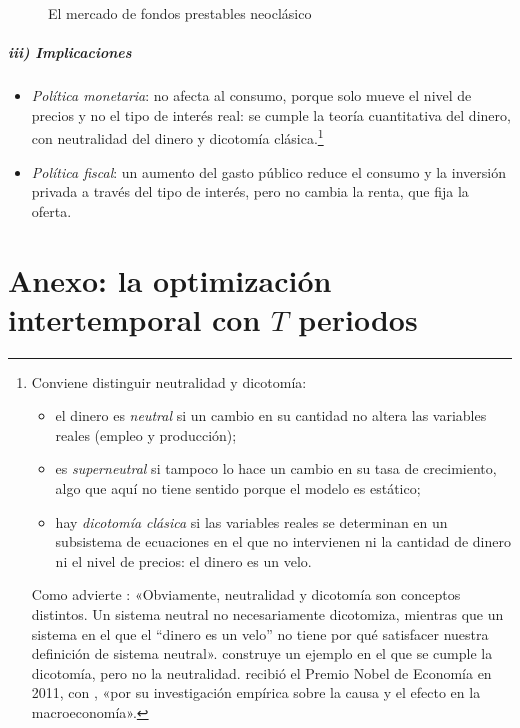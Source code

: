 \documentclass[11pt]{article}
\begin{document}
\begin{figure}[H]
\centering
\caption{El mercado de fondos prestables neoclásico}\label{fig:fondos-prestables}
\end{figure}

\subparagraph{iii) Implicaciones}

\begin{itemize}
\item \emph{Política monetaria}: no afecta al consumo, porque solo mueve el nivel de precios y no el tipo de interés real: se cumple la teoría cuantitativa del dinero, con neutralidad del dinero y dicotomía clásica.\footnote{Conviene distinguir neutralidad y dicotomía\nocite{Serletis2007Demand}:
\begin{itemize}
\item el dinero es \emph{neutral} si un cambio en su cantidad no altera las variables reales (empleo y producción);
\item es \emph{superneutral} si tampoco lo hace un cambio en su tasa de crecimiento, algo que aquí no tiene sentido porque el modelo es estático;
\item hay \emph{dicotomía clásica} si las variables reales se determinan en un subsistema de ecuaciones en el que no intervienen ni la cantidad de dinero ni el nivel de precios: el dinero es un velo.
\end{itemize}
Como advierte \textcite[p.~47]{Sargent1987Macroeconomic}: «Obviamente, neutralidad y dicotomía son conceptos distintos. Un sistema neutral no necesariamente dicotomiza, mientras que un sistema en el que el “dinero es un velo” no tiene por qué satisfacer nuestra definición de sistema neutral».  construye un ejemplo en el que se cumple la dicotomía, pero no la neutralidad.  recibió el Premio Nobel de Economía en 2011, con , «por su investigación empírica sobre la causa y el efecto en la macroeconomía»\nocite{Nobel2011SargentSims}.}
\item \emph{Política fiscal}: un aumento del gasto público reduce el consumo y la inversión privada a través del tipo de interés, pero no cambia la renta, que fija la oferta.
\end{itemize}

\section{Anexo: la optimización intertemporal con $T$ periodos}\label{anexo:optimizacion}
\end{document}
